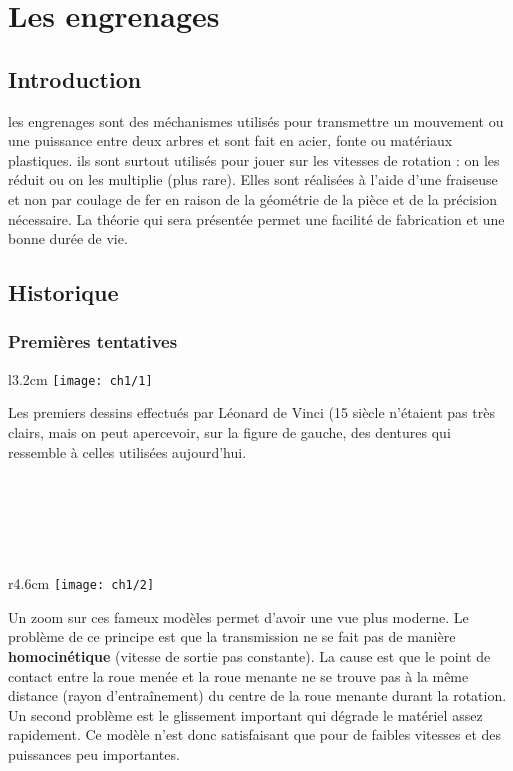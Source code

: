 
\chapter{Les engrenages}

\section{Introduction}
les engrenages sont des méchanismes utilisés pour transmettre un mouvement ou une puissance entre deux arbres et sont fait en acier, fonte ou matériaux plastiques. ils sont surtout utilisés pour jouer sur les vitesses de rotation : on les réduit ou on les multiplie (plus rare). Elles sont réalisées à l'aide d'une fraiseuse et non par coulage de fer en raison de la géométrie de la pièce et de la précision nécessaire. La théorie qui sera présentée permet une facilité de fabrication et une bonne durée de vie.
	
\section{Historique}
\subsection{Premières tentatives}
\begin{wrapfigure}[4]{l}{3.2cm}
	\vspace{-5mm}
	\texttt{[image: ch1/1]}
\end{wrapfigure}
\noindent Les premiers dessins effectués par Léonard de Vinci (15 siècle n'étaient pas très clairs, mais on peut apercevoir, sur la figure de gauche, des dentures qui ressemble à celles utilisées aujourd'hui. \\\\\\\\\\\
	
\begin{wrapfigure}[10]{r}{4.6cm}
	\vspace{-5mm}
	\texttt{[image: ch1/2]}
\end{wrapfigure}	
\noindent Un zoom sur ces fameux modèles permet d'avoir une vue plus moderne. Le problème de ce principe est que la transmission ne se fait pas de manière \textbf{homocinétique} (vitesse de sortie pas constante). La cause est que le point de contact entre la roue menée et la roue menante ne se trouve pas à la même distance (rayon d'entraînement) du centre de la roue menante durant la rotation.  \\
Un second problème est le glissement important qui dégrade le matériel assez rapidement. Ce modèle n'est donc satisfaisant que pour de faibles vitesses et des puissances peu importantes. \\\\
	
